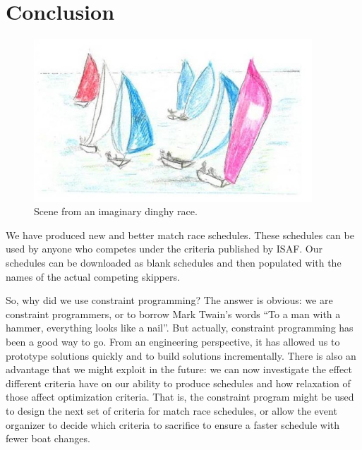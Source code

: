 \documentclass{llncs}
\begin{document}
\section{Conclusion}\label{sec:conclusions}
\begin{figure}[tb]
    \centering
    \includegraphics[keepaspectratio=true,width=4.1in]{dinghy.jpg}
\caption{Scene from an imaginary dinghy race.}
\label{dinghy}
\end{figure}

We have produced new and better match race schedules. These schedules can be used by anyone who
competes under the criteria published by ISAF. Our schedules can be downloaded as blank schedules
and then populated with the names of the actual competing skippers.

So, why did we use constraint programming? The answer is obvious:  we are constraint programmers, or
to borrow Mark Twain's words ``To a man with a hammer, everything looks like a nail''. But actually,
constraint programming has been a good way to go. From an engineering perspective, it has allowed us
to prototype solutions quickly and to build solutions incrementally. There is also an advantage that
we might exploit in the future: we can now investigate the effect different criteria have on our
ability to produce schedules and how relaxation of those affect optimization criteria. That is, the
constraint program might be used to design the next set of criteria for match race schedules, or
allow the event organizer to decide which criteria to sacrifice to ensure a faster schedule with
fewer boat changes.



\end{document}
